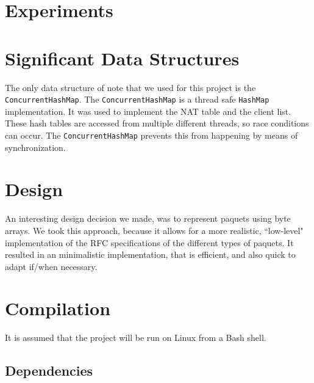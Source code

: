 \documentclass[10pt, a4paper]{article}
\begin{document}

\section{Experiments}
\label{sec:exp}



\section{Significant Data Structures}
\label{sec:sigds}

The only data structure of note that we used for this project is the
\texttt{ConcurrentHashMap}. The \texttt{ConcurrentHashMap} is a thread safe
\texttt{HashMap} implementation. It was used to implement the NAT table and the
client list. These hash tables are accessed from multiple different threads, so
race conditions can occur. The \texttt{ConcurrentHashMap} prevents this from
happening by means of synchronization.



\section{Design}
\label{sec:design}

An interesting design decision we made, was to represent paquets using byte
arrays. We took this approach, because it allows for a more realistic,
``low-level" implementation of the RFC specifications of the different types of
paquets. It resulted in an minimalistic implementation, that is efficient, and
also quick to adapt if/when necessary.



\section{Compilation}
\label{sec:comp}

It is assumed that the project will be run on Linux from a Bash shell.


\subsection{Dependencies}
\label{ssec:deps}
\end{document}
